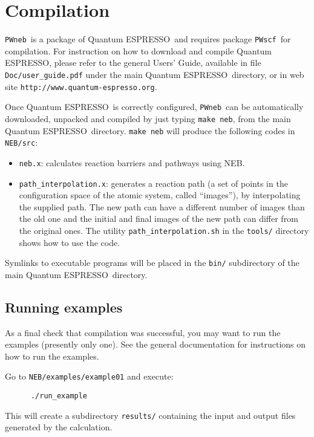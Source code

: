 \documentclass[12pt,a4paper]{article}
\def\qe{{\sc Quantum ESPRESSO}}
\def\NEB{\texttt{PWneb}} %
\def\nebx{\texttt{neb.x}}
\def\PWscf{\texttt{PWscf}}
\begin{document}


\section{Compilation}

\NEB\ is a package of \qe\ and requires package \PWscf\ for
compilation.
For instruction on how to download and compile \qe, please refer 
to the general Users' Guide, available in file \texttt{Doc/user\_guide.pdf}
under the main \qe\ directory, or in web site 
\texttt{http://www.quantum-espresso.org}.

Once \qe\ is correctly configured, \NEB\ can be automatically 
downloaded, unpacked and compiled by
just typing \texttt{make neb}, from the main \qe\ directory.
\texttt{make neb} will produce 
the following codes in \texttt{NEB/src}:
\begin{itemize}
\item \nebx: calculates reaction barriers and pathways using NEB.
\item \texttt{path\_interpolation.x}: generates a reaction path (a set of points
in the configuration space of the atomic system, called ``images''), by
 interpolating the supplied path. The new path can have a 
 different number of images than the old one and the initial and final 
 images of the new path can differ from the original ones.
 The utility \texttt{path\_interpolation.sh} in the \texttt{tools/}
 directory shows how to use the code.
\end{itemize}

Symlinks to executable programs will be placed in the
\texttt{bin/} subdirectory of the main \qe\  directory.

\subsection{Running examples}
\label{SubSec:Examples}
As a final check that compilation was successful, you may want
to run the examples (presently only one). See the general documentation
for instructions on how to run the examples.

Go to \texttt{NEB/examples/example01} and execute:
\begin{verbatim}
      ./run_example
\end{verbatim}
This will create a subdirectory \texttt{results/} containing the input and
output files generated by the calculation.
\end{document}
